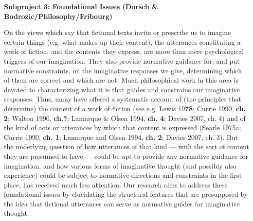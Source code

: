 

\vspace{.2cm}
\noindent\textbf{Subproject 3: Foundational Issues (Dorsch \& Bodrozic/Philosophy/Fribourg)}
\vspace{.2cm}


\vspace{.2cm}
\noindent On the views which say that fictional texts invite or prescribe us to imagine certain things (e.g. what makes up their content), the utterances constituting a work of fiction, and the contents they express, are more than mere psychological triggers of our imagination. They also provide normative guidance for, and put normative constraints, on the imaginative responses we give, determining which of them are correct and which are not. Much philosophical work in this area is devoted to characterizing what it is that guides and constrains our imaginative responses. Thus, many have offered a systematic account of (the principles that determine) the content of a work of fiction (see e.g. Lewis 19\textbf{78}; Currie 1990, \textbf{ch. 2}; Walton 1990, \textbf{ch.?}; Lamarque \& Olsen 1994, \textbf{ch. 4}; Davies 2007, ch. 4) and of the kind of acts or utterances by which that content is expressed (Searle 1975a; Currie 1990, \textbf{ch. 1}; Lamarque and Olsen 1994, \textbf{ch. 2}; Davies 2007, ch. 3). But the underlying question of how utterances of that kind --- with the sort of content they are presumed to have --- could be apt to provide any normative guidance for imagination, and how various forms of imaginative thought (and possibly also experience) could be subject to normative directions and constraints in the first place, has received much less attention. Our research aims to address these foundational issues by elucidating the structural features that are presupposed by the idea that fictional utterances can serve as normative guides for imaginative thought.

